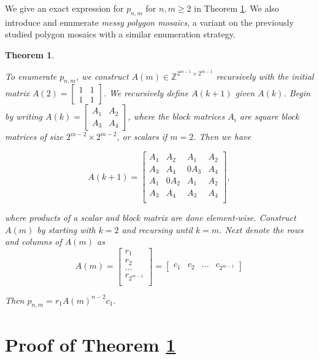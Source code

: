 \documentclass[12pt]{article}
\theoremstyle{plain}
\newtheorem{thm}{Theorem}
\theoremstyle{definition}
\theoremstyle{remark}
\theoremstyle{definition}
\begin{document}
We give an exact expression for $p_{n,m}$ for $n,m \geq 2$ in Theorem \ref{thm: main theorem}. We also introduce and enumerate \textit{messy polygon mosaics}, a variant on the previously studied polygon mosaics with a similar enumeration strategy.

\begin{thm}
\label{thm: main theorem}

To enumerate $p_{n,m}$, we construct $A(m) \in \mathbb{Z}^{2^{m-1} \times 2^{m-1}}$ recursively with the initial matrix $
A(2) = \begin{bmatrix}
1 & 1 \\
1 & 1
\end{bmatrix}
$. We recursively define $A(k+1)$ given $A(k)$. Begin by writing
$
A(k) = \begin{bmatrix}
A_1 & A_2 \\
A_3 & A_4
\end{bmatrix}
$, where the block matrices $A_i$ are square block matrices of size $2^{m-2} \times 2^{m-2}$, or scalars if $m=2$. Then we have

$$
A(k+1) = \begin{bmatrix}
A_1 & A_2 & A_1 & A_2 \\
A_3 & A_4 & 0A_3 & A_4 \\
A_1 & 0A_2 & A_1 & A_2 \\
A_3 & A_4 & A_3 & A_4 \\
\end{bmatrix},
$$

where products of a scalar and block matrix are done element-wise. Construct $A(m)$ by starting with $k=2$ and recursing until $k=m$. Next denote the rows and columns of $A(m)$ as
$$
A(m) = 
\begin{bmatrix}
    r_1 \\
    r_2 \\
    ... \\
    r_{2^{m-1}} \\
\end{bmatrix} = 
\begin{bmatrix}
    c_1 & c_2 & ... & c_{2^{m-1}}
\end{bmatrix}
$$

Then $p_{n,m} = r_1 A(m)^{n-2}c_1 .$
\end{thm}

\section{Proof of Theorem \ref{thm: main theorem}}
\end{document}
